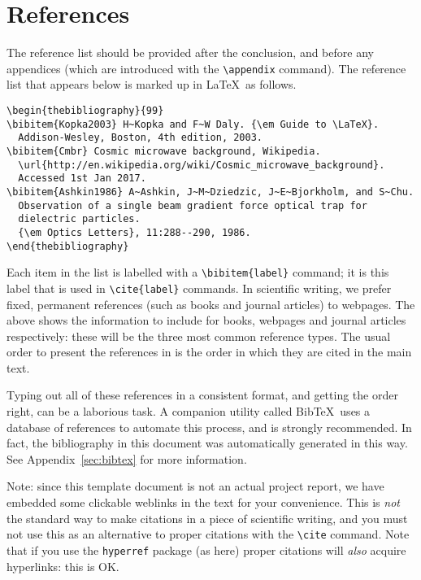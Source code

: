 \section{References}  %
\label{sec:refs}

The reference list should be provided after the conclusion, and before any appendices (which are introduced with the \verb|\appendix| command). The reference list that appears below is marked up in \LaTeX\ as follows.

\begin{verbatim}
\begin{thebibliography}{99}
\bibitem{Kopka2003} H~Kopka and F~W Daly. {\em Guide to \LaTeX}.
  Addison-Wesley, Boston, 4th edition, 2003.
\bibitem{Cmbr} Cosmic microwave background, Wikipedia.
  \url{http://en.wikipedia.org/wiki/Cosmic_microwave_background}.
  Accessed 1st Jan 2017.
\bibitem{Ashkin1986} A~Ashkin, J~M~Dziedzic, J~E~Bjorkholm, and S~Chu. 
  Observation of a single beam gradient force optical trap for
  dielectric particles.
  {\em Optics Letters}, 11:288--290, 1986.
\end{thebibliography}
\end{verbatim}

Each item in the list is labelled with a \verb|\bibitem{label}| command; it is this label that is used in \verb|\cite{label}| commands. In scientific writing, we prefer fixed, permanent references (such as books and journal articles) to webpages. The above shows the information to include for books, webpages and journal articles respectively: these will be the three most common reference types. The usual order to present the references in is the order in which they are cited in the main text.

Typing out all of these references in a consistent format, and getting the order right, can be a laborious task. A companion utility called Bib\TeX\ uses a database of references to automate this process, and is strongly recommended. In fact, the bibliography in this document was automatically generated in this way. See Appendix~\ref{sec:bibtex} for more information.

Note: since this template document is not an actual project report, we have embedded some clickable weblinks in the text for your convenience. This is \emph{not} the standard way to make citations in a piece of scientific writing, and you must not use this as an alternative to proper citations with the \verb|\cite| command. Note that if you use the \verb|hyperref| package (as here) proper citations will \emph{also} acquire hyperlinks: this is OK.

